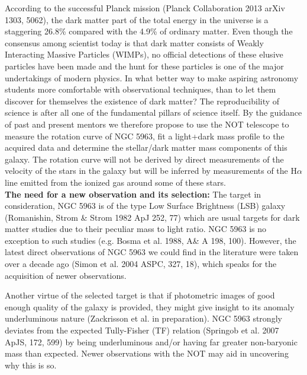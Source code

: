 \documentclass[11pt]{article}           %
\begin{document}
\begin{scienpage}[][]{}
{\noindent According to the successful Planck mission (Planck Collaboration 2013 arXiv 1303, 5062), the dark matter
part of the total energy in the universe is a staggering 26.8\%
compared with the 4.9\% of ordinary matter. Even though the consensus among scientist
today is that dark matter consists of Weakly Interacting Massive Particles
(WIMPs), no official detections of these elusive particles have been made and
the hunt for these particles is one of the major undertakings of modern physics.
In what better way to make aspiring astronomy students more comfortable
with observational techniques, than to let them discover for
themselves the existence of dark matter? The reproducibility of science is
after all one of the fundamental pillars of science itself.
By the guidance of past and present mentors we therefore propose to use the
NOT telescope
to measure the rotation curve of NGC 5963, fit a light+dark mass profile 
to the acquired data and determine the stellar/dark matter mass components of
this galaxy. The rotation curve will not be derived by direct measurements 
of the velocity of the stars in the galaxy but will be inferred by measurements
of the H$\alpha$ line emitted from the ionized gas around some of these stars.   \\

\noindent \textbf{The need for a new observation and its selection:} The target in consideration, NGC 5963 is of the type Low Surface Brightness (LSB) galaxy (Romanishin, Strom \& Strom 1982 ApJ 252, 77) which are usual targets for dark matter studies due to their peculiar mass to light ratio. NGC 5963 is no exception to such studies (e.g. Bosma et al. 1988, A\& A 198, 100). However, the latest  direct observations of NGC 5963 we could find in the literature were taken over a decade ago (Simon et al. 2004 ASPC, 327, 18), which speaks for the acquisition of newer observations. 
\par
Another virtue of the selected target is that if photometric images of good enough quality of the galaxy is provided, they might give insight to its anomaly underluminous nature (Zackrisson et al. in preparation). NGC 5963 strongly deviates from the expected Tully-Fisher (TF) relation (Springob et al. 2007 ApJS, 172, 599) by being underluminous and/or having far greater non-baryonic mass than expected. Newer observations with the NOT may aid in uncovering why this is so.
 
   }
\end{scienpage}
\end{document}

